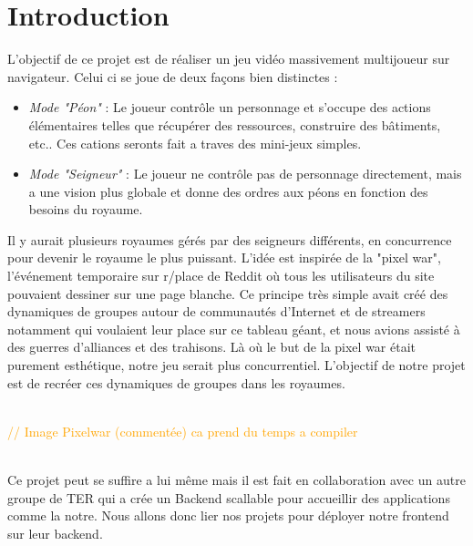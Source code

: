 \section{Introduction}
        L'objectif de ce projet est de réaliser un jeu vidéo massivement multijoueur sur navigateur. Celui ci se joue de deux façons bien distinctes :
        \begin{itemize}
            \item \textit{Mode "Péon"} : Le joueur contrôle un personnage et s'occupe des actions élémentaires telles que récupérer des ressources, construire des bâtiments, etc.. Ces cations seronts fait a traves des mini-jeux simples.
            \item \textit{Mode "Seigneur"} : Le joueur ne contrôle pas de personnage directement, mais a une vision plus globale et donne des ordres aux péons en fonction des besoins du royaume.
        \end{itemize}
        Il y aurait plusieurs royaumes gérés par des seigneurs différents, en concurrence pour devenir le royaume le plus puissant. L'idée est inspirée de la "pixel war", l'événement temporaire sur r/place de Reddit où tous les utilisateurs du site pouvaient dessiner sur une page blanche. Ce principe très simple avait créé des dynamiques de groupes autour de communautés d'Internet et de streamers notamment qui voulaient leur place sur ce tableau géant, et nous avions assisté à des guerres d'alliances et des trahisons. Là où le but de la pixel war était purement esthétique, notre jeu serait plus concurrentiel. L'objectif de notre projet est de recréer ces dynamiques de groupes dans les royaumes.


        \\

        \textcolor{orange}{// Image Pixelwar (commentée) ca prend du temps a compiler}

        \\


        Ce projet peut se suffire a lui même mais il est fait en collaboration avec un autre groupe de TER qui a crée un Backend scallable pour accueillir des applications comme la notre. Nous allons donc lier nos projets pour déployer notre frontend sur leur backend.


